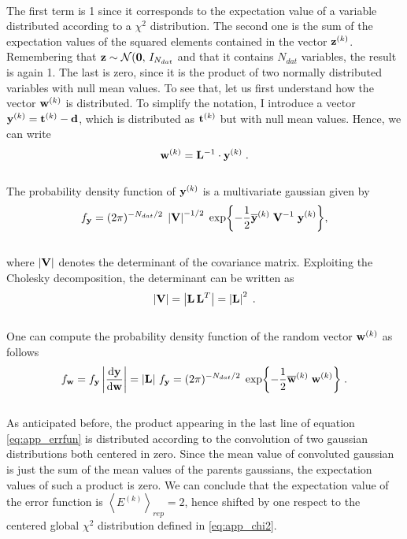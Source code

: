 \\
The first term is 1 since it corresponds to the expectation value of a variable distributed according to a $\chi^2$ distribution. The second one is the sum of the expectation values of the squared elements contained in the vector $\mathbf{z}^{(k)}$. Remembering that $\mathbf{z} \sim \mathcal{N}(\mathbf{0},\, I_{N_{dat}}$ and that it contains $N_{dat}$ variables, the result is again 1. The last is zero, since it is the product of two normally distributed variables with null mean values. To see that, let us first understand how the vector $\mathbf{w}^{(k)}$ is distributed. To simplify the notation, I introduce a vector $\mathbf{y}^{(k)} = \mathbf{t}^{(k)} - \mathbf{d}$, which is distributed as $\mathbf{t}^{(k)}$ but with null mean values. Hence, we can write
\\
\begin{equation}
    \mathbf{w}^{(k)} = \mathbf{L}^{-1} \cdot \mathbf{y}^{(k)} \;.
\end{equation}
\\
The probability density function of $\mathbf{y}^{(k)}$ is a multivariate gaussian given by
\\
\begin{equation}
    f_{\mathbf{y}} = (2\pi)^{-N_{dat}/2} \; \left| \mathbf{V} \right|^{-1/2} \; \exp{-\frac{1}{2}\overline{\mathbf{y}}^{(k)} \; \mathbf{V}^{-1} \; \mathbf{y}^{(k)}},
\end{equation}
\\
where $\left| \mathbf{V} \right|$ denotes the determinant of the covariance matrix. Exploiting the Cholesky decomposition, the determinant can be written as 
\\
\begin{equation}
    \left| \mathbf{V} \right| = \left| \mathbf{L} \, \mathbf{L}^T \right| = \left| \mathbf{L} \right|^2 \;.
\end{equation}
\\
One can compute the probability density function of the random vector $\mathbf{w}^{(k)}$ as follows
\\
\begin{equation}
    f_{\mathbf{w}} = f_{\mathbf{y}} \left| \dv{\mathbf{y}}{\mathbf{w}} \right| = \left|\mathbf{L} \right| \, f_{\mathbf{y}} = (2\pi)^{-N_{dat}/2} \; \exp{-\frac{1}{2}\overline{\mathbf{w}}^{(k)} \; \mathbf{w}^{(k)}} \; .
\end{equation}
\\
As anticipated before, the product appearing in the last line of equation \eqref{eq:app_errfun} is distributed according to the convolution of two gaussian distributions both centered in zero. Since the mean value of convoluted gaussian is just the sum of the mean values of the parents gaussians, the expectation values of such a product is zero. We can conclude that the expectation value of the error function is $\left< E^{(k)} \right>_{rep}=2$, hence shifted by one respect to the centered global $\chi^2$ distribution defined in \eqref{eq:app_chi2}. 